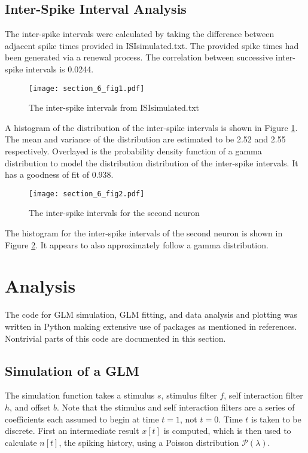 \documentclass[letterpaper,titlepage,10pt]{article}
\begin{document}
\subsection{Inter-Spike Interval Analysis}

The inter-spike intervals were calculated by taking the difference between adjacent spike times provided in
ISIsimulated.txt. The provided spike times had been generated via a renewal process. The correlation between
successive inter-spike intervals is 0.0244.

\begin{figure}[H]
\texttt{[image: section\_6\_fig1.pdf]}
\caption{The inter-spike intervals from ISIsimulated.txt}
\label{fig61}
\end{figure}

A histogram of the distribution of the inter-spike intervals is shown in Figure \ref{fig61}. The mean and variance of
the distribution are estimated to be 2.52 and 2.55 respectively. Overlayed is the probability density function of a
gamma distribution to model the distribution distribution of the inter-spike intervals. It has a goodness of fit of
0.938.

\begin{figure}[H]
\texttt{[image: section\_6\_fig2.pdf]}
\caption{The inter-spike intervals for the second neuron}
\label{fig62}
\end{figure}

The histogram for the inter-spike intervals of the second neuron is shown in Figure \ref{fig62}. It appears to also approximately follow a gamma distribution.

\section{Analysis}

The code for GLM simulation, GLM fitting, and data analysis and plotting was written in Python making extensive use
of packages as mentioned in references. Nontrivial parts of this code are documented in this section.

\subsection{Simulation of a GLM}

The simulation function takes a stimulus $s$, stimulus filter $f$, self interaction filter $h$, and offset $b$. Note
that the stimulus and self interaction filters are a series of coefficients each assumed to begin at time $t=1$, not
$t=0$. Time $t$ is taken to be discrete. First an intermediate result $x[t]$ is computed, which is then used to
calculate $n[t]$, the spiking history, using a Poisson distribution $\mathcal{P}(\lambda)$.
\end{document}
